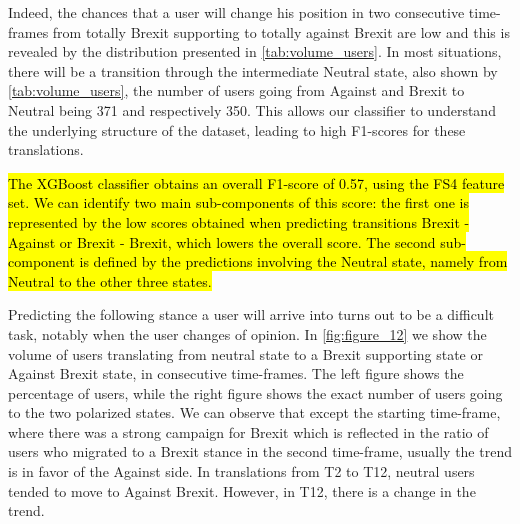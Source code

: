 \documentclass[runningheads]{llncs}
\newcommand{\cl}[1]{\todo[linecolor=darkpastelgreen,backgroundcolor=darkpastelgreen!25,bordercolor=darkpastelgreen]{\textbf{CL:} #1}\xspace}
\begin{document}
Indeed, the chances that a user will change his position in two consecutive time-frames from totally Brexit supporting to totally against Brexit are low and this is revealed by the distribution presented in \cref{tab:volume_users}.  In most situations, there will be a transition through the intermediate Neutral state, also shown by \cref{tab:volume_users}, the number of users going from Against and Brexit to Neutral being 371 and respectively 350. This allows our classifier to understand the underlying structure of the dataset, leading to high F1-scores for these translations.

\hl{The XGBoost classifier obtains an overall F1-score of 0.57, using the FS4 feature set. We can identify two main sub-components of this score: the first one is represented by the low scores obtained when predicting transitions Brexit - Against or Brexit - Brexit, which lowers the overall score. The second sub-component is defined by the predictions involving the Neutral state, namely from Neutral to the other three states.}

Predicting the following stance a user will arrive into turns out to be a difficult task, notably when the user changes of opinion. 
\cl{verifier figure envoye par mel le 8/05 Pbl}
In \cref{fig:figure_12} we show the volume of users translating from neutral state to a Brexit supporting state or Against Brexit state, in consecutive time-frames. The left figure shows the percentage of users, while the right figure shows the exact number of users going to the two polarized states. We can observe that except the starting time-frame, where there was a strong campaign for Brexit which is reflected in the ratio of users who migrated to a Brexit stance in the second time-frame, usually the trend is in favor of the Against side. In translations from T2 to T12, neutral users tended to move to Against Brexit. However, in T12, there is a change in the trend. 
\end{document}
